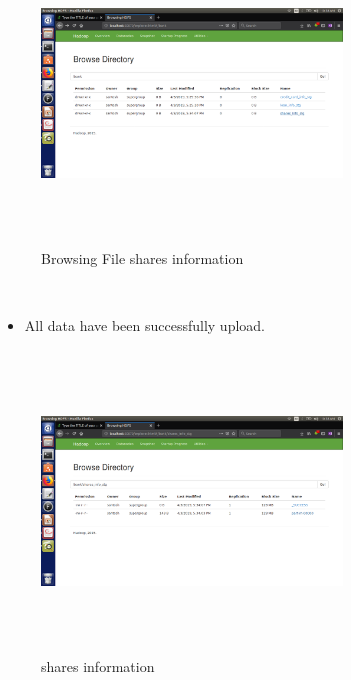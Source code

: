 \begin{figure}[htb]
\centering
\includegraphics[width=8cm,height=8cm]{9thp.png}
    \caption{Browsing File shares information}
\end{figure} \newpage
\\

\begin{itemize}
    \item All data have been successfully upload.
\end{itemize}
\begin{figure}[htb]
\centering
\includegraphics[width=8cm,height=8cm]{10p.png}
    \caption{shares information}
\end{figure} \newpage


